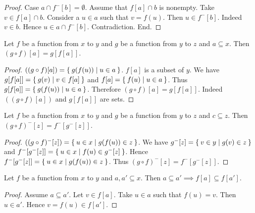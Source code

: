 \documentclass[../../set-theory.ftl.tex]{subfiles}
\begin{document}
\begin{forthel}
\begin{proof}
      Case $a \cap f^{-}[b] = \emptyset$.
        Assume that $f[a] \cap b$ is nonempty.
        Take $v \in f[a] \cap b$.
        Consider a $u \in a$ such that $v = f(u)$.
        Then $u \in f^{-}[b]$.
        Indeed $v \in b$.
        Hence $u \in a \cap f^{-}[b]$.
        Contradiction.
      End.
    \end{proof}

    \begin{proposition}\label{SetTheory_02_02_522811}
      Let $f$ be a function from $x$ to $y$ and $g$ be a function from $y$ to $z$ and $a \subseteq x$.
      Then $(g \circ f)[a] = g[f[a]]$.
    \end{proposition}
    \begin{proof}
      $((g \circ f)[a]) = \Set{g(f(u)) | u \in a}$.
      $f[a]$ is a subset of $y$.
      We have $g[f[a]] = \Set{g(v) | v \in f[a]}$ and $f[a] = \Set{f(u) | u \in a}$.
      Thus $g[f[a]] = \Set{g(f(u)) | u \in a}$.
      Therefore $(g \circ f)[a] = g[f[a]]$.
      Indeed $((g \circ f)[a])$ and $g[f[a]]$ are sets.
    \end{proof}

    \begin{proposition}\label{SetTheory_02_02_819065}
      Let $f$ be a function from $x$ to $y$ and $g$ be a function from $y$ to $z$ and $c \subseteq z$.
      Then $(g \circ f)^{-}[z] = f^{-}[g^{-}[z]]$.
    \end{proposition}
    \begin{proof}
      $((g \circ f)^{-}[z]) = \Set{u \in x | g(f(u)) \in z}$.
      We have $g^{-}[z] = \Set{v \in y | g(v) \in z}$ and $f^{-}[g^{-}[z]] = \Set{u \in x | f(u) \in g^{-}[z]}$.
      Hence $f^{-}[g^{-}[z]] = \Set{u \in x | g(f(u)) \in z}$.
      Thus $(g \circ f)^{-}[z] = f^{-}[g^{-}[z]]$.
    \end{proof}

    \begin{proposition}\label{SetTheory_02_02_889945}
      Let $f$ be a function from $x$ to $y$ and $a,a' \subseteq x$.
      Then $a \subseteq a' \implies f[a] \subseteq f[a']$.
    \end{proposition}
    \begin{proof}
      Assume $a \subseteq a'$.
      Let $v \in f[a]$.
      Take $u \in a$ such that $f(u) = v$.
      Then $u \in a'$.
      Hence $v = f(u) \in f[a']$.
    \end{proof}


\end{forthel}
\end{document}
